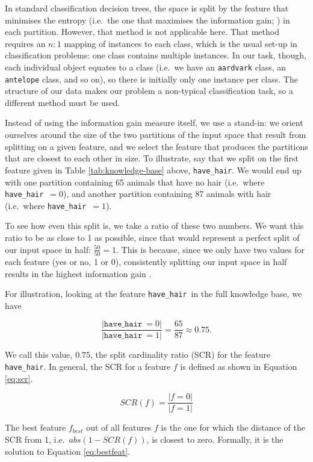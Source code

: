 \documentclass[11pt,a4paper]{article}
\newcommand{\havehair}{\texttt{have\_hair}}
\begin{document}
In standard classification decision trees, the space is split by the feature that minimises the entropy (i.e.\ the one that maximises the information gain; \citealt{Quinlan1986}) in each partition.
However, that method is not applicable here.
That method requires an $n : 1$ mapping of instances to each class, which is the usual set-up in classification problems: one class contains multiple instances.
In our task, though, each individual object equates to a class (i.e.\ we have an \texttt{aardvark} class, an \texttt{antelope} class, and so on), so there is initially only one instance per class.
The structure of our data makes our problem a non-typical classification task, so a different method must be used.

Instead of using the information gain measure itself, we use a stand-in: we orient ourselves around the size of the two partitions of the input space that result from splitting on a given feature, and we select the feature that produces the partitions that are closest to each other in size.
To illustrate, say that we split on the first feature given in Table \ref{tab:knowledge-base} above, \havehair.
We would end up with one partition containing 65 animals that have no hair (i.e.\ where \havehair\ $= 0$), and another partition containing 87 animals with hair (i.e.\ where \havehair\ $= 1$).

To see how even this split is, we take a ratio of these two numbers.
We want this ratio to be as close to 1 as possible, since that would represent a perfect split of our input space in half: $\frac{50}{50} = 1$.
This is because, since we only have two values for each feature (yes or no, 1 or 0), consistently splitting our input space in half results in the highest information gain \citep[cf.][]{Quinlan1986, Bishop2006}.

For illustration, looking at the feature \havehair\ in the full knowledge base, we have

$$\frac{|\havehair\ = 0|}{|\havehair\ = 1|} = \frac{65}{87} \approx 0.75.$$

We call this value, $0.75$, the split cardinality ratio (SCR) for the feature \havehair.
In general, the SCR for a feature $f$ is defined as shown in Equation \ref{eq:scr}.

\begin{equation}
SCR(f) = \frac{|f = 0|}{|f = 1|} 
\label{eq:scr}
\end{equation}

The best feature $f_{best}$ out of all features $f$ is the one for which the distance of the SCR from 1, i.e.\ $abs(1 - SCR(f))$, is closest to zero.
Formally, it is the solution to Equation \ref{eq:bestfeat}.
\end{document}
